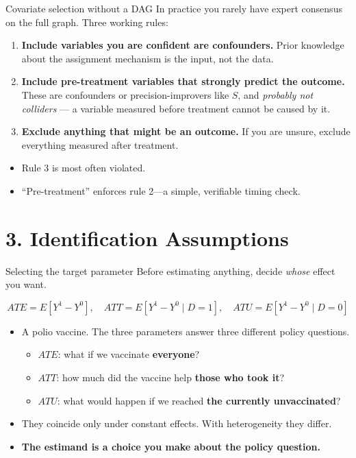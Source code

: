 \documentclass[
  11pt,
  ignorenonframetext,
  aspectratio=169,
]{beamer}
\providecommand{\tightlist}{%
  \setlength{\itemsep}{0pt}\setlength{\parskip}{0pt}}
\begin{document}
\begin{frame}{Covariate selection without a DAG}
\protect{}\label{covariate-selection-without-a-dag}
In practice you rarely have expert consensus on the full graph. Three
working rules:

\begin{enumerate}
\tightlist
\item
  \textbf{Include variables you are confident are confounders.} Prior
  knowledge about the assignment mechanism is the input, not the data.
\item
  \textbf{Include pre-treatment variables that strongly predict the
  outcome.} These are confounders or precision-improvers like \(S\), and
  \emph{probably not colliders} --- a variable measured before treatment
  cannot be caused by it.
\item
  \textbf{Exclude anything that might be an outcome.} If you are unsure,
  exclude everything measured after treatment.
\end{enumerate}

\vspace{0.3em}

\begin{itemize}
\tightlist
\item
  Rule 3 is most often violated.
\item
  ``Pre-treatment'' enforces rule 2---a simple, verifiable timing check.
\end{itemize}
\end{frame}

\section{3. Identification
Assumptions}\label{identification-assumptions}

\begin{frame}{Selecting the target parameter}
\protect{}\label{selecting-the-target-parameter}
Before estimating anything, decide \emph{whose} effect you want.

\[
ATE = E[Y^1 - Y^0], \quad
ATT = E[Y^1 - Y^0 \mid D{=}1], \quad
ATU = E[Y^1 - Y^0 \mid D{=}0]
\]

\begin{itemize}
\tightlist
\item
  A polio vaccine. The three parameters answer three different policy
  questions.

  \begin{itemize}
  \tightlist
  \item
    \(ATE\): what if we vaccinate \textbf{everyone}?
  \item
    \(ATT\): how much did the vaccine help \textbf{those who took it}?
  \item
    \(ATU\): what would happen if we reached \textbf{the currently
    unvaccinated}?
  \end{itemize}
\item
  They coincide only under constant effects. With heterogeneity they
  differ.
\item
  \textbf{The estimand is a choice you make about the policy question.}
\end{itemize}
\end{frame}
\end{document}
